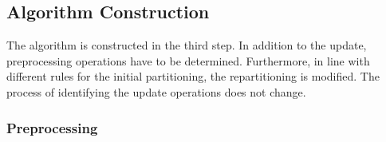 








\subsection{Algorithm Construction}

The algorithm is constructed in the third step. In addition to the update, preprocessing operations have to be determined. Furthermore, in line with different rules for the initial partitioning, the repartitioning is modified. The process of identifying the update operations does not change.

\subsubsection{Preprocessing}

